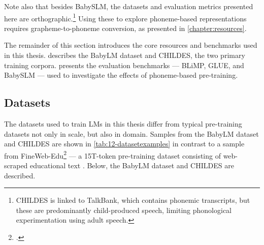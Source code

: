 Note also that besides BabySLM, the datasets and evaluation metrics presented here are orthographic.\footnote{CHILDES is linked to TalkBank, which contains phonemic transcripts, but these are predominantly child-produced speech, limiting phonological experimentation using adult speech.} Using these to explore phoneme-based representations requires grapheme-to-phoneme conversion, as presented in \cref{chapter:resources}. 

The remainder of this section introduces the core resources and benchmarks used in this thesis.  describes the BabyLM dataset and CHILDES, the two primary training corpora.  presents the evaluation benchmarks --- BLiMP, GLUE, and BabySLM --- used to investigate the effects of phoneme-based pre-training.



\subsection{Datasets}\label{sec:12-datasets}

The datasets used to train LMs in this thesis differ from typical pre-training datasets not only in scale, but also in domain. Samples from the BabyLM dataset and CHILDES are shown in \cref{tab:12-datasetexamples} in contrast to a sample from FineWeb-Edu\footnote{\href{https://huggingface.co/datasets/HuggingFaceFW/fineweb-edu}{}.} --- a 15T-token pre-training dataset consisting of web-scraped educational text \citep{penedo2024finewebdatasetsdecantingweb}. Below, the BabyLM dataset and CHILDES are described.

